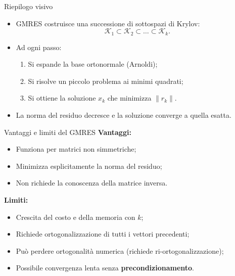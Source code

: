 \documentclass[aspectratio=169]{beamer}
\begin{document}
\begin{frame}{Riepilogo visivo}
\begin{itemize}
  \item GMRES costruisce una successione di sottospazi di Krylov:
  \[
  \mathcal{K}_1 \subset \mathcal{K}_2 \subset \dots \subset \mathcal{K}_k.
  \]
  \item Ad ogni passo:
  \begin{enumerate}
    \item Si espande la base ortonormale (Arnoldi);
    \item Si risolve un piccolo problema ai minimi quadrati;
    \item Si ottiene la soluzione $x_k$ che minimizza $\|r_k\|$.
  \end{enumerate}
  \item La norma del residuo decresce e la soluzione converge a quella esatta.
\end{itemize}
\end{frame}

\begin{frame}{Vantaggi e limiti del GMRES}
\textbf{Vantaggi:}
\begin{itemize}
  \item Funziona per matrici non simmetriche;
  \item Minimizza esplicitamente la norma del residuo;
  \item Non richiede la conoscenza della matrice inversa.
\end{itemize}

\textbf{Limiti:}
\begin{itemize}
  \item Crescita del costo e della memoria con $k$;
  \item Richiede ortogonalizzazione di tutti i vettori precedenti;
  \item Può perdere ortogonalità numerica (richiede ri-ortogonalizzazione);
  \item Possibile convergenza lenta senza \textbf{precondizionamento}.
\end{itemize}
\end{frame}
\end{document}
